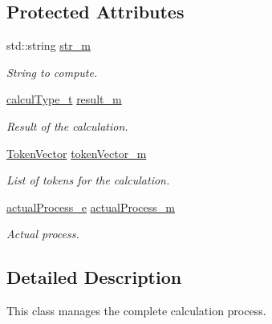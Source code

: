 \subsection*{Protected Attributes}
\begin{DoxyCompactItemize}
\item 
\hypertarget{class_analyze_a5eaf2648206b44a7136f00f6f2aea716}{}std\+::string \hyperlink{class_analyze_a5eaf2648206b44a7136f00f6f2aea716}{str\+\_\+m}\label{class_analyze_a5eaf2648206b44a7136f00f6f2aea716}

\begin{DoxyCompactList}\small\item\em String to compute. \end{DoxyCompactList}\item 
\hypertarget{class_analyze_a8fd3ae44bbbc0fc1c2f332da9fb3fb51}{}\hyperlink{mpfr_interface_8h_a993860352aef57b15399903c4475a608}{calcul\+Type\+\_\+t} \hyperlink{class_analyze_a8fd3ae44bbbc0fc1c2f332da9fb3fb51}{result\+\_\+m}\label{class_analyze_a8fd3ae44bbbc0fc1c2f332da9fb3fb51}

\begin{DoxyCompactList}\small\item\em Result of the calculation. \end{DoxyCompactList}\item 
\hypertarget{class_analyze_a0cb9f60bf517b50df90aa9669199f61c}{}\hyperlink{token_8h_ab47f31774188c3fad94acfd21e12c917}{Token\+Vector} \hyperlink{class_analyze_a0cb9f60bf517b50df90aa9669199f61c}{token\+Vector\+\_\+m}\label{class_analyze_a0cb9f60bf517b50df90aa9669199f61c}

\begin{DoxyCompactList}\small\item\em List of tokens for the calculation. \end{DoxyCompactList}\item 
\hypertarget{class_analyze_a41743a35d696fd86ab0e4af616a6cd9a}{}\hyperlink{class_analyze_aee7ac80c3a9b19650f0d3dd3bf8712d9}{actual\+Process\+\_\+e} \hyperlink{class_analyze_a41743a35d696fd86ab0e4af616a6cd9a}{actual\+Process\+\_\+m}\label{class_analyze_a41743a35d696fd86ab0e4af616a6cd9a}

\begin{DoxyCompactList}\small\item\em Actual process. \end{DoxyCompactList}\end{DoxyCompactItemize}


\subsection{Detailed Description}
This class manages the complete calculation process. 

